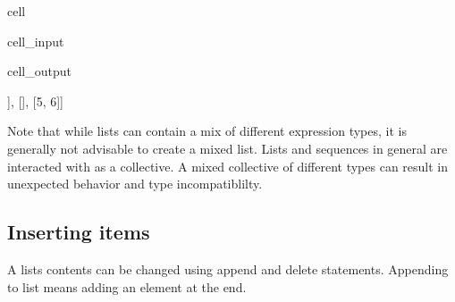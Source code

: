 \documentclass[letterpaper,10pt,english]{jupyterBook}
\begin{document}
\begin{sphinxuseclass}{cell}\begin{sphinxVerbatimInput}

\begin{sphinxuseclass}{cell_input}
\begin{sphinxVerbatim}[commandchars=\\\{\}]
\PYG{p}{[}\PYG{p}{[}\PYG{p}{[}\PYG{p}{]}\PYG{p}{]}\PYG{p}{[}\PYG{p}{]}\PYG{p}{[}\PYG{p}{]}\PYG{p}{]}
\end{sphinxVerbatim}

\end{sphinxuseclass}\end{sphinxVerbatimInput}
\begin{sphinxVerbatimOutput}

\begin{sphinxuseclass}{cell_output}
\begin{sphinxVerbatim}[commandchars=\\\{\}]
[[1, 2, 3, [4]], [], [5, 6]]
\end{sphinxVerbatim}

\end{sphinxuseclass}\end{sphinxVerbatimOutput}

\end{sphinxuseclass}
\sphinxAtStartPar
Note that while lists can contain a mix of different expression types, it is generally not advisable to create a mixed list. Lists and sequences in general are interacted with as a collective. A mixed collective of different types can result in unexpected behavior and type incompatiblilty.


\subsection{Inserting items}
\label{\detokenize{datatypes:inserting-items}}
\sphinxAtStartPar
A lists contents can be changed using append and delete statements. Appending to list means adding an element at the end.
\end{document}
